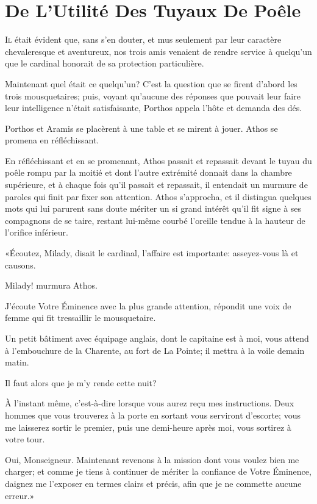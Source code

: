 
\chapter{De L'Utilité Des Tuyaux De Poêle}

\lettrine{I}{l} était évident que, sans s'en douter, et mus seulement par leur caractère chevaleresque et aventureux, nos trois amis venaient de rendre service à quelqu'un que le cardinal honorait de sa protection particulière. 

Maintenant quel était ce quelqu'un? C'est la question que se firent d'abord les trois mousquetaires; puis, voyant qu'aucune des réponses que pouvait leur faire leur intelligence n'était satisfaisante, Porthos appela l'hôte et demanda des dés. 

Porthos et Aramis se placèrent à une table et se mirent à jouer. Athos se promena en réfléchissant. 

En réfléchissant et en se promenant, Athos passait et repassait devant le tuyau du poêle rompu par la moitié et dont l'autre extrémité donnait dans la chambre supérieure, et à chaque fois qu'il passait et repassait, il entendait un murmure de paroles qui finit par fixer son attention. Athos s'approcha, et il distingua quelques mots qui lui parurent sans doute mériter un si grand intérêt qu'il fit signe à ses compagnons de se taire, restant lui-même courbé l'oreille tendue à la hauteur de l'orifice inférieur. 

«Écoutez, Milady, disait le cardinal, l'affaire est importante: asseyez-vous là et causons. 

\speak  Milady! murmura Athos. 

\speak  J'écoute Votre Éminence avec la plus grande attention, répondit une voix de femme qui fit tressaillir le mousquetaire. 

\speak  Un petit bâtiment avec équipage anglais, dont le capitaine est à moi, vous attend à l'embouchure de la Charente, au fort de La Pointe; il mettra à la voile demain matin. 

\speak  Il faut alors que je m'y rende cette nuit? 

\speak  À l'instant même, c'est-à-dire lorsque vous aurez reçu mes instructions. Deux hommes que vous trouverez à la porte en sortant vous serviront d'escorte; vous me laisserez sortir le premier, puis une demi-heure après moi, vous sortirez à votre tour. 

\speak  Oui, Monseigneur. Maintenant revenons à la mission dont vous voulez bien me charger; et comme je tiens à continuer de mériter la confiance de Votre Éminence, daignez me l'exposer en termes clairs et précis, afin que je ne commette aucune erreur.» 

